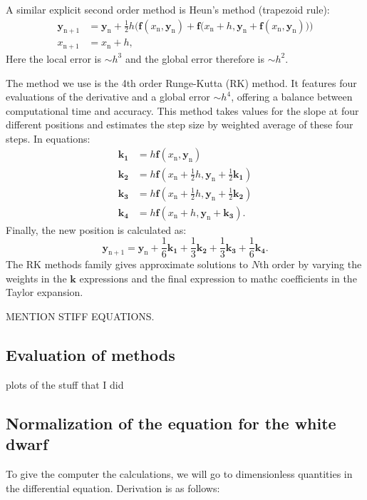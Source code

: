 \documentclass[]{article}
\renewcommand{\vec}[1]{\boldsymbol{#1}}
\begin{document}
A similar explicit second order method is Heun's method (trapezoid rule):
\begin{align}
	\vec{y}_\mathrm{n+1} &= \vec{y}_\mathrm{n} + \frac{1}{2} h \Big(\vec{f}(x_\mathrm{n}, \vec{y}_\mathrm{n}) + \vec{f}\big(x_\mathrm{n} + h, \vec{y}_\mathrm{n} + \vec{f}(x_\mathrm{n}, \vec{y}_\mathrm{n})\big)\Big)\\
	x_\mathrm{n+1} &= x_\mathrm{n} + h, \nonumber
\end{align}
Here the local error is $\sim h^3$ and the global error therefore is $\sim h^2$.

The method we use is the 4th order Runge-Kutta (RK) method. It features four evaluations of the derivative and a global error $\sim h^4$, offering a balance between computational time and accuracy. This method takes values for the slope at four different positions and estimates the step size by weighted average of these four steps. In equations:
\begin{align*}
	\vec{k_1} &= h \vec{f}(x_\mathrm{n}, \vec{y}_\mathrm{n})\\
	\vec{k_2} &= h \vec{f}\left(x_\mathrm{n} + \frac{1}{2} h, \vec{y}_\mathrm{n} + \frac{1}{2}\vec{k_1}\right)\\
	\vec{k_3} &= h \vec{f}\left(x_\mathrm{n} + \frac{1}{2} h, \vec{y}_\mathrm{n} + \frac{1}{2}\vec{k_2}\right)\\
	\vec{k_4} &= h \vec{f}(x_\mathrm{n} + h, \vec{y}_\mathrm{n} + \vec{k_3}).
\end{align*}
Finally, the new position is calculated as:
\begin{equation}
	\vec{y}_\mathrm{n+1} = \vec{y}_\mathrm{n} + \frac{1}{6} \vec{k_1} + \frac{1}{3} \vec{k_2} + \frac{1}{3} \vec{k_3} + \frac{1}{6} \vec{k_4}.
\end{equation}
The RK methods family gives approximate solutions to $N$th order by varying the weights in the $\vec{k}$ expressions and the final expression to mathc coefficients in the Taylor expansion.

{\color{red} MENTION STIFF EQUATIONS.}

\subsection{Evaluation of methods}
plots of the stuff that I did
\subsection{Normalization of the equation for the white dwarf}
To give the computer the calculations, we will go to dimensionless quantities in the differential equation. Derivation is as follows:
\end{document}
